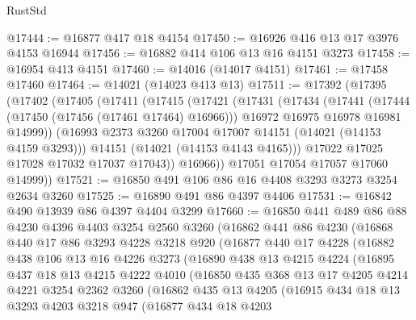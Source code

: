 \begin{lexlean}{RustStd}
\begin{coremodule}
{\begin{coremodule}
{{{{{{{{{{{{{{{{{{{{{{{{{{{{{{{{{{{{{{{@17444 := @16877 @417 @18 @4154
@17450 := @16926 @416 @13 @17 @3976 @4153 @16944
@17456 := @16882 @414 @106 @13 @16 @4151 @3273
@17458 := @16954 @413 @4151
@17460 := @14016 (@14017 @4151)
@17461 := @17458 @17460
@17464 := @14021 (@14023 @413 @13)
@17511 := @17392
    (@17395
      (@17402
        (@17405
          (@17411
            (@17415
              (@17421
                (@17431
                  (@17434
                    (@17441
                      (@17444 (@17450 (@17456 (@17461 @17464) @16966)))
                      @16972
                      @16975
                      @16978
                      @16981
                      @14999))
                  (@16993 @2373 @3260 @17004 @17007 @14151 (@14021 (@14153 @4159 @3293)))
                  @14151
                  (@14021 (@14153 @4143 @4165)))
                @17022
                @17025
                @17028
                @17032
                @17037
                @17043))
            @16966))
        @17051
        @17054
        @17057
        @17060
        @14999))
@17521 := @16850 @491 @106 @86 @16 @4408 @3293 @3273 @3254 @2634 @3260
@17525 := @16890 @491 @86 @4397 @4406
@17531 := @16842 @490 @13939 @86 @4397 @4404 @3299
@17660 := @16850
    @441
    @489
    @86
    @88
    @4230
    @4396
    @4403
    @3254
    @2560
    @3260
    (@16862
      @441
      @86
      @4230
      (@16868
        @440
        @17
        @86
        @3293
        @4228
        @3218
        @920
        (@16877
          @440
          @17
          @4228
          (@16882
            @438
            @106
            @13
            @16
            @4226
            @3273
            (@16890
              @438
              @13
              @4215
              @4224
              (@16895
                @437
                @18
                @13
                @4215
                @4222
                @4010
                (@16850
                  @435
                  @368
                  @13
                  @17
                  @4205
                  @4214
                  @4221
                  @3254
                  @2362
                  @3260
                  (@16862
                    @435
                    @13
                    @4205
                    (@16915
                      @434
                      @18
                      @13
                      @3293
                      @4203
                      @3218
                      @947
                      (@16877
                        @434
                        @18
                        @4203
}}}}}}}}}}}}}}}}}}}}}}}}}}}}}}}}}}}}}}}
\end{coremodule}}
\end{coremodule}
\end{lexlean}
